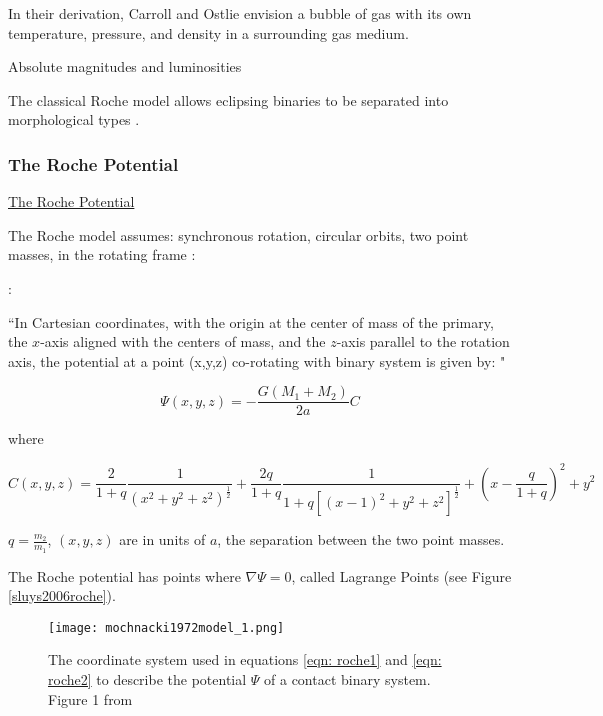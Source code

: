 \documentclass[12pt]{article} %
\numberwithin{equation}{section} %
\begin{document}
In their derivation, Carroll and Ostlie envision a bubble of gas with its own temperature, pressure, and density in a surrounding gas medium. 

Absolute magnitudes and luminosities \citep{rucinski1997absolute} \citep{rucinski2006luminosity}

The classical Roche model allows eclipsing binaries to be separated into morphological types \citep{terrell2001eclipsing}.

\subsubsection{The Roche Potential}{\hyperlink{toc}{The Roche Potential}} \label{sec: The Roche Potential}

The Roche model assumes: synchronous rotation, circular orbits, two point masses, in the rotating frame \citep{kopal1959close} :

\citet{mochnacki1984accurate}:

``In Cartesian coordinates, with the origin at the center of mass of the primary, the $x$-axis aligned with the centers of mass, and the $z$-axis parallel to the rotation axis, the potential at a point (x,y,z) co-rotating with binary system is given by: "

\begin{equation} \label{eqn: roche1}
\Psi(x, y, z) = -\frac{G(M_{1} + M_{2})}{2a} C
\end{equation}

where 

\begin{equation} \label{eqn: roche2}
C(x,y,z) = \frac{2}{1+q} \frac{1}{(x^{2} + y^{2} + z^{2})^{\frac{1}{2}}} + \frac{2q}{1 + q} \frac{1}{1 + q[(x -1)^{2} + y^{2} + z^{2}]^{\frac{1}{2}}} + (x - \frac{q}{1 + q})^{2} + y^{2}
\end{equation}

$q = \frac{m_{2}}{m_{1}}$, $(x,y,z)$ are in units of $a$, the separation between the two point masses.

The Roche potential has points where $\nabla \Psi = 0$, called Lagrange Points (see Figure \ref{sluys2006roche}). 

\begin{figure}[H]
\centering
\texttt{[image: mochnacki1972model\_1.png]}
\caption{The coordinate system used in equations \ref{eqn: roche1} and \ref{eqn: roche2} to describe the potential $\Psi$ of a contact binary system. Figure 1 from \citet{mochnacki1972model}}
\label{fig: mochnacki1972model_1}
\end{figure}
\end{document}
